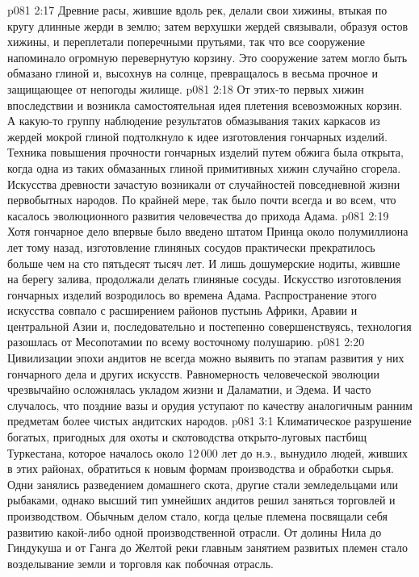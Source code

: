 \vs p081 2:17 Древние расы, жившие вдоль рек, делали свои хижины, втыкая по кругу длинные жерди в землю; затем верхушки жердей связывали, образуя остов хижины, и переплетали поперечными прутьями, так что все сооружение напоминало огромную перевернутую корзину. Это сооружение затем могло быть обмазано глиной и, высохнув на солнце, превращалось в весьма прочное и защищающее от непогоды жилище.
\vs p081 2:18 От этих\hyp{}то первых хижин впоследствии и возникла самостоятельная идея плетения всевозможных корзин. А какую\hyp{}то группу наблюдение результатов обмазывания таких каркасов из жердей мокрой глиной подтолкнуло к идее изготовления гончарных изделий. Техника повышения прочности гончарных изделий путем обжига была открыта, когда одна из таких обмазанных глиной примитивных хижин случайно сгорела. Искусства древности зачастую возникали от случайностей повседневной жизни первобытных народов. По крайней мере, так было почти всегда и во всем, что касалось эволюционного развития человечества до прихода Адама.
\vs p081 2:19 Хотя гончарное дело впервые было введено штатом Принца около полумиллиона лет тому назад, изготовление глиняных сосудов практически прекратилось больше чем на сто пятьдесят тысяч лет. И лишь дошумерские нодиты, жившие на берегу залива, продолжали делать глиняные сосуды. Искусство изготовления гончарных изделий возродилось во времена Адама. Распространение этого искусства совпало с расширением районов пустынь Африки, Аравии и центральной Азии и, последовательно и постепенно совершенствуясь, технология разошлась от Месопотамии по всему восточному полушарию.
\vs p081 2:20 Цивилизации эпохи андитов не всегда можно выявить по этапам развития у них гончарного дела и других искусств. Равномерность человеческой эволюции чрезвычайно осложнялась укладом жизни и Даламатии, и Эдема. И часто случалось, что поздние вазы и орудия уступают по качеству аналогичным ранним предметам более чистых андитских народов.
\vs p081 3:1 Климатическое разрушение богатых, пригодных для охоты и скотоводства открыто\hyp{}луговых пастбищ Туркестана, которое началось около 12\,000 лет до н.э., вынудило людей, живших в этих районах, обратиться к новым формам производства и обработки сырья. Одни занялись разведением домашнего скота, другие стали земледельцами или рыбаками, однако высший тип умнейших андитов решил заняться торговлей и производством. Обычным делом стало, когда целые племена посвящали себя развитию какой\hyp{}либо одной производственной отрасли. От долины Нила до Гиндукуша и от Ганга до Желтой реки главным занятием развитых племен стало возделывание земли и торговля как побочная отрасль.
